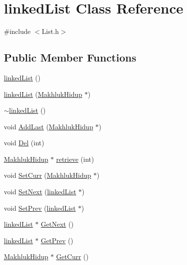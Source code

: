 \hypertarget{classlinked_list}{}\section{linked\+List Class Reference}
\label{classlinked_list}


{\ttfamily \#include $<$List.\+h$>$}

\subsection*{Public Member Functions}
\begin{DoxyCompactItemize}
\item 
\hyperlink{classlinked_list_a9c60821596e60f06c51e72c15f919709}{linked\+List} ()
\item 
\hyperlink{classlinked_list_a48697c9dde287ec065bd968cdd39b7ea}{linked\+List} (\hyperlink{class_makhluk_hidup}{Makhluk\+Hidup} $\ast$)
\item 
\hyperlink{classlinked_list_a8667006a08e31c5a52835749eb15fca4}{$\sim$linked\+List} ()
\item 
void \hyperlink{classlinked_list_abfccc5a0dfc257fea6dffd6717f935a5}{Add\+Last} (\hyperlink{class_makhluk_hidup}{Makhluk\+Hidup} $\ast$)
\item 
void \hyperlink{classlinked_list_a680ba19e4eaf4f3b923de498a76a9768}{Del} (int)
\item 
\hyperlink{class_makhluk_hidup}{Makhluk\+Hidup} $\ast$ \hyperlink{classlinked_list_ad810b23d27e11a44dc551ff7d507dc4e}{retrieve} (int)
\item 
void \hyperlink{classlinked_list_a3db922e69a1a03c95bbf0f966920462a}{Set\+Curr} (\hyperlink{class_makhluk_hidup}{Makhluk\+Hidup} $\ast$)
\item 
void \hyperlink{classlinked_list_a2dcd8a48e8fe874b8f1847b52cb4950f}{Set\+Next} (\hyperlink{classlinked_list}{linked\+List} $\ast$)
\item 
void \hyperlink{classlinked_list_a73393452a59e9a4d9958ca9f301e5ee2}{Set\+Prev} (\hyperlink{classlinked_list}{linked\+List} $\ast$)
\item 
\hyperlink{classlinked_list}{linked\+List} $\ast$ \hyperlink{classlinked_list_a75213b3c1e4bf71a8fe7c6fb1aeb2d9c}{Get\+Next} ()
\item 
\hyperlink{classlinked_list}{linked\+List} $\ast$ \hyperlink{classlinked_list_aca4819988d60a89c6f61132ca9997a63}{Get\+Prev} ()
\item 
\hyperlink{class_makhluk_hidup}{Makhluk\+Hidup} $\ast$ \hyperlink{classlinked_list_a979e7bc9816fda56541832eb5f3be4f5}{Get\+Curr} ()
\end{DoxyCompactItemize}


